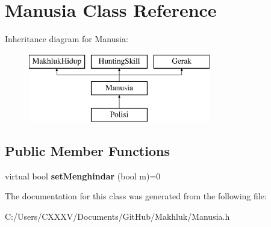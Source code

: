 \hypertarget{class_manusia}{}\section{Manusia Class Reference}
\label{class_manusia}
Inheritance diagram for Manusia\+:\begin{figure}[H]
\begin{center}
\leavevmode
\includegraphics[height=3.000000cm]{class_manusia}
\end{center}
\end{figure}
\subsection*{Public Member Functions}
\begin{DoxyCompactItemize}
\item 
virtual bool {\bfseries set\+Menghindar} (bool m)=0\hypertarget{class_manusia_a37cf3c739bc94ba903e506d2e146869a}{}\label{class_manusia_a37cf3c739bc94ba903e506d2e146869a}

\end{DoxyCompactItemize}


The documentation for this class was generated from the following file\+:\begin{DoxyCompactItemize}
\item 
C\+:/\+Users/\+C\+X\+X\+X\+V/\+Documents/\+Git\+Hub/\+Makhluk/Manusia.\+h\end{DoxyCompactItemize}
